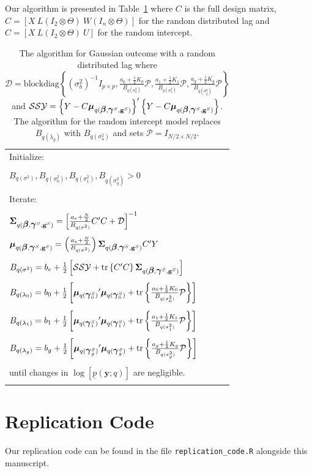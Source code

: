 \documentclass[10pt]{article}
\newcommand{\bbeta}{{\mbox{\boldmath$\beta$}}}
\newcommand{\bgamma}{{\mbox{\boldmath$\gamma$}}}
\newcommand{\bmu}{{\mbox{\boldmath$\mu$}}}
\newcommand{\bSigma}{{\mbox{\boldmath$\Sigma$}}}
\newcommand{\by}{\textbf{y}}
\newcommand{\bg}{\textbf{g}}
\newcommand{\up}{\underline{p}}
\begin{document}
Our algorithm is presented in Table~\ref{t:ga} where $C$ is the full design matrix, $C = [X\ L(I_2\otimes\Theta)\ W(I_n \otimes\Theta)]$ for the random distributed lag and $C = [X\ L(I_2\otimes\Theta)\ U]$ for the random intercept. 	
	\begin{table}
		\centering
		\caption{The algorithm for Gaussian outcome with a random distributed lag where $\mathcal{D}  = \text{blockdiag}\left\{ (\sigma_b^2)^{-1} I_{p\times p}, \frac{a_0 + \frac{1}{2} K_0}{B_{q(\sigma_0^2)}} \mathcal{P}, \frac{a_1 + \frac{1}{2} K_1}{B_{q(\sigma_1^2)}} \mathcal{P}, \frac{a_g + \frac{1}{2} K_g}{B_{q(\sigma_g^2)}} \mathcal{P} \right\}$ and $\mathcal{SSY} = \left\{Y - C\bmu_{q(\bbeta, \bgamma^S, \bg^S)} \right\}'\left\{Y - C\bmu_{q(\bbeta, \bgamma^S, \bg^S)} \right\}$. The algorithm for the random intercept model replaces $B_{q(\lambda_g)}$ with $B_{q(\sigma_u^2)}$ and sets $\mathcal{P} = I_{N/2\times N/2}$.\\ \label{t:ga}}
		\begin{tabular}{lll}
			\hline
			\hline
			Initialize: &  & \\
			 & & \\
			$B_{q(\sigma^2)}, B_{q(\sigma_0^2)}, B_{q(\sigma_1^2)}, B_{q(\sigma_g^2)} > 0$ & & \\
			 & & \\
			\hline
			Iterate: &  & \\
			 & & \\
			  $\bSigma_{q(\bbeta, \bgamma^S, \bg^S)} = \left[ \frac{a_e + \frac{N}{2}}{B_{q(\sigma^2)}}C'C + \mathcal{D} \right]^{-1}$ & \\
			 &  & \\
			  $\bmu_{q(\bbeta, \bgamma^S, \bg^S)} = \left( \frac{a_e + \frac{N}{2}}{B_{q(\sigma^2)}}\right)\bSigma_{q(\bbeta, \bgamma^S, \bg^S)}C'Y $ & \\
			 &  & \\
			  $B_{q(\sigma^2)} = b_e + \frac{1}{2}\left[ \mathcal{SSY} + \text{tr}\left\{ C'C \right\}\bSigma_{q(\bbeta, \bgamma^S, \bg^S)} \right]$ & \\
			 &  & \\
			  $B_{q(\lambda_0)} = b_ 0 + \frac{1}{2}\left[ {\bmu_{q(\bgamma_0^S)}}'\bmu_{q(\bgamma_0^S)} + \text{tr}\left\{\frac{a_0 + \frac{1}{2} K_0}{B_{q(\sigma_0^2)}} \mathcal{P} \right\} \right]$ & \\
			 &  & \\
			 $B_{q(\lambda_1)} = b_ 1 + \frac{1}{2}\left[ {\bmu_{q(\bgamma_1^S)}}'\bmu_{q(\bgamma_1^S)} + \text{tr}\left\{\frac{a_1 + \frac{1}{2} K_1}{B_{q(\sigma_1^2)}} \mathcal{P} \right\} \right]$ & \\
			 &  & \\
			  $B_{q(\lambda_g)} = b_ g + \frac{1}{2}\left[ {\bmu_{q(\bgamma_g^S)}}'\bmu_{q(\bgamma_g^S)} + \text{tr}\left\{\frac{a_g + \frac{1}{2} K_g}{B_{q(\sigma_g^2)}}  \mathcal{P} \right\} \right]$ & \\
			 &  & \\
			\multicolumn{2}{l}{until changes in $\log[ \up(\by; q) ]$ are negligible.}  &\\
			 & & \\
			\hline
			\hline
		\end{tabular}
	\end{table}


	
\section{Replication Code}
\label{a:code}
Our replication code can be found in the file \texttt{replication\_code.R} alongside this manuscript.
\end{document}
